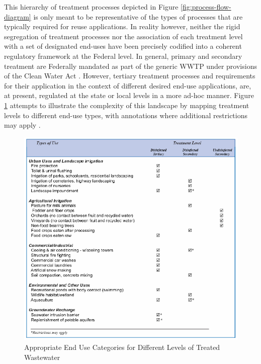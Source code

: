 This hierarchy of treatment processes depicted in Figure \ref{fig:process-flow-diagram} is only meant to be representative of the types of processes that are typically required for reuse applications. In reality however, neither the rigid segregation of treatment processes nor the association of each treatment level with a set of designated end-uses have been precisely codified into a coherent regulatory framework at the Federal level. In general, primary and secondary treatment are Federally mandated as part of the generic WWTP under provisions of the Clean Water Act \cite{NRC2008,CDHS2001}. However, tertiary treatment processes and requirements for their application in the context of different desired end-use applications, are, at present, regulated at the state or local levels in a more ad-hoc manner. Figure \ref{fig:use-categories} attempts to illustrate the complexity of this landscape by mapping treatment levels to different end-use types, with annotations where additional restrictions may apply \cite{NRC2008,Romero-Hernandez2004}.

     \begin{figure}[!h]
       \centering
       \includegraphics[width=5.5in]{figures/use-categories.png}
       \caption[Appropriate End Use Categories for Different Levels of Treated Wastewater]{Appropriate End Use Categories for Different Levels of Treated Wastewater \cite{Klein2005}}
       \label{fig:use-categories}
     \end{figure}
     
